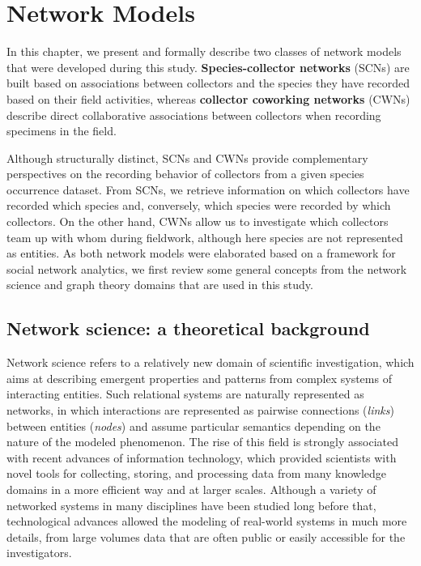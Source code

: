 \chapter{Network Models}\label{chapter:network_models}

In this chapter, we present and formally describe two classes of network models that were developed during this study.
\textbf{Species-collector networks} (SCNs) are built based on associations between collectors and the species they have recorded based on their field activities, whereas \textbf{collector coworking networks} (CWNs) describe direct collaborative associations between collectors when recording specimens in the field.

Although structurally distinct, SCNs and CWNs provide complementary perspectives on the recording behavior of collectors from a given species occurrence dataset. 
From SCNs, we retrieve information on which collectors have recorded which species and, conversely, which species were recorded by which collectors. 
On the other hand, CWNs allow us to investigate which collectors team up with whom during fieldwork, although here species are not represented as entities.
As both network models were elaborated based on a framework for social network analytics, we first review some general concepts from the network science and graph theory domains that are used in this study.



\section{Network science: a theoretical background}\label{section:networkscience}

Network science refers to a relatively new domain of scientific investigation, which aims at describing emergent properties and patterns from complex systems of interacting entities.
Such relational systems are naturally represented as networks, in which interactions are represented as pairwise connections (\textit{links}) between entities (\textit{nodes}) and assume particular semantics depending on the nature of the modeled phenomenon.
The rise of this field is strongly associated with recent advances of information technology, which provided scientists with novel tools for collecting, storing, and processing data from many knowledge domains in a more efficient way and at larger scales.
Although a variety of networked systems in many disciplines have been studied long before that, technological advances allowed the modeling of real-world systems in much more details, from large volumes data that are often public or easily accessible for the investigators.



